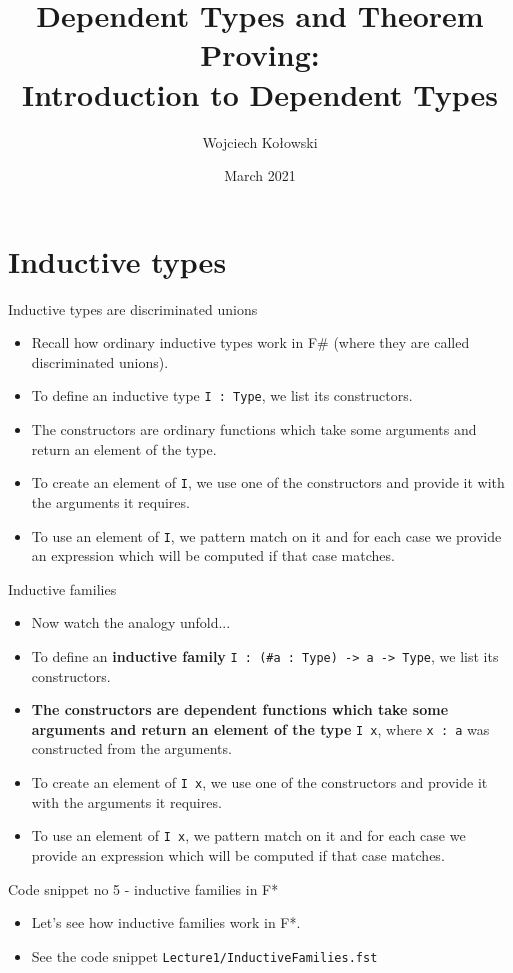\documentclass{beamer}
\title{Dependent Types and Theorem Proving: \\Introduction to Dependent Types}
\author{Wojciech Kołowski}
\date{March 2021}
\newcommand{\m}[1]{\texttt{#1}}
\begin{document}
\frame{\titlepage}
\frame{\tableofcontents}

\section{Inductive types}

\begin{frame}{Inductive types are discriminated unions}
\begin{itemize}
	\item Recall how ordinary inductive types work in F\# (where they are called discriminated unions).
	\item To define an inductive type \m{I :\ Type}, we list its constructors.
	\item The constructors are ordinary functions which take some arguments and return an element of the type.
	\item To create an element of \m{I}, we use one of the constructors and provide it with the arguments it requires.
	\item To use an element of \m{I}, we pattern match on it and for each case we provide an expression which will be computed if that case matches.
\end{itemize}
\end{frame}

\begin{frame}{Inductive families}
\begin{itemize}
	\item Now watch the analogy unfold...
	\item To define an \textbf{inductive family} \m{I : (\#a :\ Type) -> a -> Type}, we list its constructors.
	\item \textbf{The constructors are dependent functions which take some arguments and return an element of the type} \m{I x}, where \m{x :\ a} was constructed from the arguments.
	\item To create an element of \m{I x}, we use one of the constructors and provide it with the arguments it requires.
	\item To use an element of \m{I x}, we pattern match on it and for each case we provide an expression which will be computed if that case matches.
\end{itemize}
\end{frame}

\begin{frame}{Code snippet no 5 - inductive families in F*}
\begin{itemize}
	\item Let's see how inductive families work in F*.
	\item See the code snippet \m{Lecture1/InductiveFamilies.fst}
\end{itemize}
\end{frame}
\end{document}
